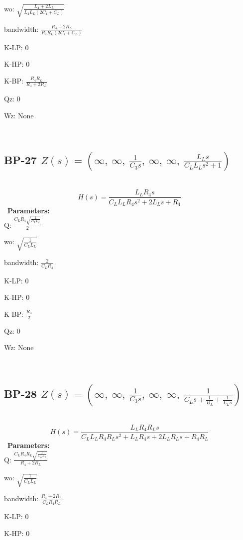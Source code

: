 \documentclass{article}
\begin{document}
wo: $\sqrt{\frac{L_{4} + 2 L_{L}}{L_{4} L_{L} \left(2 C_{4} + C_{L}\right)}}$\ 

bandwidth: $\frac{R_{4} + 2 R_{L}}{R_{4} R_{L} \left(2 C_{4} + C_{L}\right)}$\ 

K-LP: $0$\ 

K-HP: $0$\ 

K-BP: $\frac{R_{4} R_{L}}{R_{4} + 2 R_{L}}$\ 

Qz: $0$\ 

Wz: $\text{None}$\ 

\ 

\subsection{BP-27 $Z(s) = \left( \infty, \  \infty, \  \frac{1}{C_{3} s}, \  \infty, \  \infty, \  \frac{L_{L} s}{C_{L} L_{L} s^{2} + 1}\right)$ } \ 
\textbf{\[H(s) = \frac{L_{L} R_{4} s}{C_{L} L_{L} R_{4} s^{2} + 2 L_{L} s + R_{4}}\] } \ 
\textbf{Parameters:}\\ 

Q: $\frac{C_{L} R_{4} \sqrt{\frac{1}{C_{L} L_{L}}}}{2}$\ 

wo: $\sqrt{\frac{1}{C_{L} L_{L}}}$\ 

bandwidth: $\frac{2}{C_{L} R_{4}}$\ 

K-LP: $0$\ 

K-HP: $0$\ 

K-BP: $\frac{R_{4}}{2}$\ 

Qz: $0$\ 

Wz: $\text{None}$\ 

\ 

\subsection{BP-28 $Z(s) = \left( \infty, \  \infty, \  \frac{1}{C_{3} s}, \  \infty, \  \infty, \  \frac{1}{C_{L} s + \frac{1}{R_{L}} + \frac{1}{L_{L} s}}\right)$ } \ 
\textbf{\[H(s) = \frac{L_{L} R_{4} R_{L} s}{C_{L} L_{L} R_{4} R_{L} s^{2} + L_{L} R_{4} s + 2 L_{L} R_{L} s + R_{4} R_{L}}\] } \ 
\textbf{Parameters:}\\ 

Q: $\frac{C_{L} R_{4} R_{L} \sqrt{\frac{1}{C_{L} L_{L}}}}{R_{4} + 2 R_{L}}$\ 

wo: $\sqrt{\frac{1}{C_{L} L_{L}}}$\ 

bandwidth: $\frac{R_{4} + 2 R_{L}}{C_{L} R_{4} R_{L}}$\ 

K-LP: $0$\ 

K-HP: $0$\ 
\end{document}
